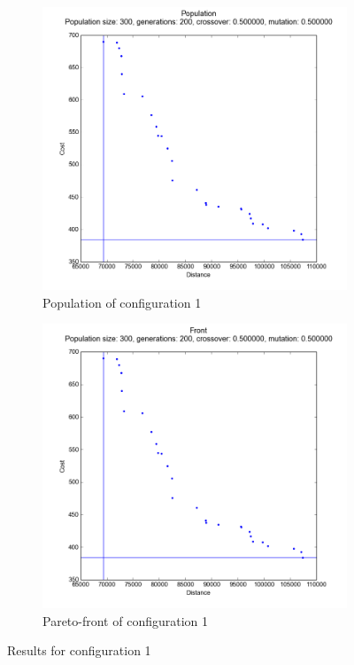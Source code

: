 \documentclass[
]{article}
\begin{document}
\begin{figure}[H]
    \centering
    \begin{subfigure}[b]{0.45\textwidth}
        \includegraphics[width=\textwidth]{config-1-population.png}
        \caption{Population of configuration 1}
    \end{subfigure}
    \begin{subfigure}[b]{0.45\textwidth}
        \includegraphics[width=\textwidth]{config-1-front.png}
        \caption{Pareto-front of configuration 1}
    \end{subfigure}
    \caption{Results for configuration 1}
    \label{config-1}
\end{figure}
\end{document}
